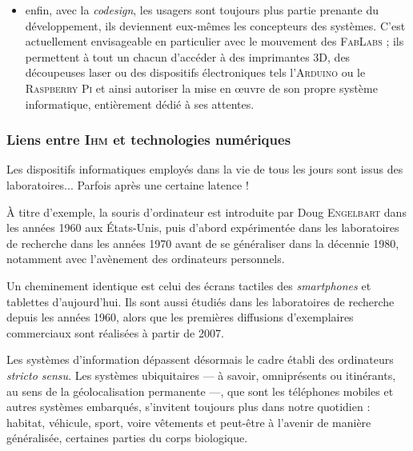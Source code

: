 \begin{itemize}
	\item enfin, avec la \emph{\gls{codesign}}, les usagers sont toujours plus partie prenante du développement, ils deviennent eux-mêmes les concepteurs des systèmes. C'est actuellement envisageable en particulier avec le mouvement des \textsc{FabLabs} ; ils permettent à tout un chacun d'accéder à des imprimantes 3D, des découpeuses laser ou des dispositifs électroniques tels l'\textsc{Arduino} ou le \textsc{Raspberry Pi} et ainsi autoriser la mise en œuvre de son propre système informatique, entièrement dédié à ses attentes.
\end{itemize}


\subsubsection[\textsc{Ihm} et technologies]{Liens entre \textsc{Ihm} et technologies numériques}
\label{subsub:I.3.1.4}

 Les dispositifs informatiques employés dans la vie de tous les jours sont issus des laboratoires... Parfois après une certaine latence ! 

À titre d'exemple, la souris d'ordinateur est introduite par Doug \textsc{Engelbart} dans les années 1960 aux États-Unis, puis d'abord expérimentée dans les laboratoires de recherche dans les années 1970 avant de se généraliser dans la décennie 1980, notamment avec l'avènement des ordinateurs personnels.

Un cheminement identique est celui des écrans tactiles des \textit{smartphones} et tablettes d'aujourd'hui. Ils sont aussi étudiés dans les laboratoires de recherche depuis les années 1960, alors que les premières diffusions d'exemplaires commerciaux sont réalisées à partir de 2007. 

Les systèmes d'information dépassent désormais le cadre établi des ordinateurs \textit{stricto sensu}. Les systèmes ubiquitaires --- à savoir, omniprésents ou itinérants, au sens de la géolocalisation permanente ---, que sont les téléphones mobiles et autres systèmes embarqués, s'invitent toujours plus dans notre quotidien : habitat, véhicule, sport, voire vêtements et peut-être à l'avenir de manière généralisée, certaines parties du corps biologique.


